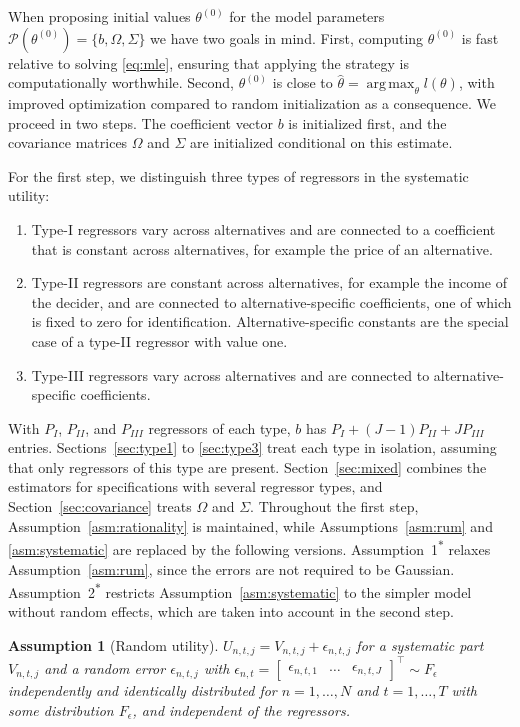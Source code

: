 \documentclass[preprint,12pt,authoryear]{elsarticle}
\DeclareRobustCommand{\asmstar}[1]{#1\textsuperscript{$\ast$}}
\newcommand{\assumptionvarname}{}
\newtheorem*{assumptionvarthm}{Assumption \assumptionvarname}
\newenvironment{assumptionvar}[1]{\renewcommand{\assumptionvarname}{#1}\begin{assumptionvarthm}}{\end{assumptionvarthm}}
\DeclareMathOperator*{\argmax}{arg\,max}
\begin{document}
When proposing initial values $\theta^{(0)}$ for the model parameters $\mathcal{P}(\theta^{(0)}) = \{b, \Omega, \Sigma \}$ we have two goals in mind. First, computing $\theta^{(0)}$ is fast relative to solving \eqref{eq:mle}, ensuring that applying the strategy is computationally worthwhile. Second, $\theta^{(0)}$ is close to $\hat{\theta} = \argmax_\theta l(\theta)$, with improved optimization compared to random initialization as a consequence. We proceed in two steps. The coefficient vector $b$ is initialized first, and the covariance matrices $\Omega$ and $\Sigma$ are initialized conditional on this estimate.

For the first step, we distinguish three types of regressors in the systematic utility:
%
\begin{enumerate}
    \item Type-I regressors vary across alternatives and are connected to a coefficient that is constant across alternatives, for example the price of an alternative.
    \item Type-II regressors are constant across alternatives, for example the income of the decider, and are connected to alternative-specific coefficients, one of which is fixed to zero for identification. Alternative-specific constants are the special case of a type-II regressor with value one.
    \item Type-III regressors vary across alternatives and are connected to alternative-specific coefficients.
\end{enumerate}
%
With $P_I$, $P_{II}$, and $P_{III}$ regressors of each type, $b$ has $P_I + (J-1) P_{II} + J P_{III}$ entries. Sections~\ref{sec:type1} to \ref{sec:type3} treat each type in isolation, assuming that only regressors of this type are present. Section~\ref{sec:mixed} combines the estimators for specifications with several regressor types, and Section~\ref{sec:covariance} treats $\Omega$ and $\Sigma$. Throughout the first step, Assumption~\ref{asm:rationality} is maintained, while Assumptions~\ref{asm:rum} and \ref{asm:systematic} are replaced by the following versions. Assumption~\asmstar{1} relaxes Assumption~\ref{asm:rum}, since the errors are not required to be Gaussian. Assumption~\asmstar{2} restricts Assumption~\ref{asm:systematic} to the simpler model without random effects, which are taken into account in the second step.

\begin{assumptionvar}{\asmstar{1}}[Random utility]
$U_{n,t,j} = V_{n,t,j} + \epsilon_{n,t,j}$ for a systematic part $V_{n,t,j}$ and a random error $\epsilon_{n,t,j}$ with $\epsilon_{n,t} = \begin{bmatrix} \epsilon_{n,t,1} & \dots & \epsilon_{n,t,J} \end{bmatrix}^\top \sim F_\epsilon$ independently and identically distributed for $n = 1,\dots,N$ and $t = 1,\dots,T$ with some distribution $F_\epsilon$, and independent of the regressors.
\end{assumptionvar}
\end{document}
